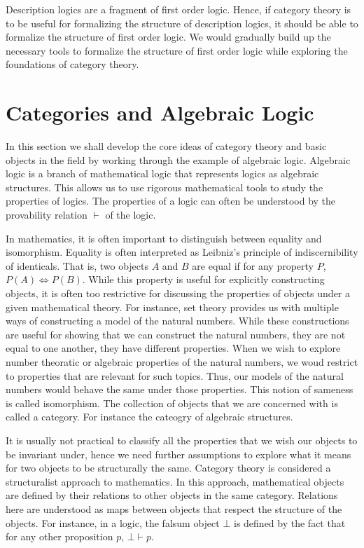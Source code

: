 Description logics are a fragment of first order logic. Hence, if category theory
is to be useful for formalizing the structure of description logics,
it should be able to formalize the structure of first order logic.
We would gradually build up the necessary tools to formalize the structure of first order logic
while exploring the foundations of category theory.

\section{Categories and Algebraic Logic}\label{sec:cat_alg_logic}
In this section we shall develop the core ideas of category theory and basic objects in the field
by working through the example of algebraic logic.
Algebraic logic is a branch of mathematical logic that represents logics as algebraic structures.
This allows us to use rigorous mathematical tools to study the properties of logics.
The properties of a logic can often be understood by 
the provability relation $\vdash$ of the logic.

In mathematics, it is often important to distinguish between equality and isomorphism.
Equality is often interpreted as Leibniz's principle of indiscernibility of identicals.
That is, two objects $A$ and $B$ are equal if for any property $P$, $P(A)\iff P(B)$.
While this property is useful for explicitly constructing objects,
it is often too restrictive for discussing the properties of objects under
a given mathematical theory. For instance, set theory
provides us with multiple ways of constructing a model of the natural numbers.
While these constructions are useful for showing that we can construct the natural numbers,
they are not equal to one another, they have different properties.
When we wish to explore number theoratic or algebraic properties of the natural numbers,
we woud restrict to properties that are relevant for such topics. Thus, our
models of the natural numbers would behave the same under those properties. This notion
of sameness is called isomorphism. The collection of objects that we are concerned
with is called a category. For instance the cateogry of algebraic structures.

It is usually not practical to classify all the properties that we wish our objects to be invariant under,
hence we need further assumptions to explore what it means for two objects to be structurally the same.
Category theory is considered a structuralist approach to mathematics.
In this approach, mathematical objects are defined by their relations to other objects
in the same category. 
Relations here are understood as maps between objects that respect the structure of the objects.
For instance, in a logic, the falsum object $\bot$ is defined by the fact that for any
other proposition $p$, $\bot\vdash p$.


